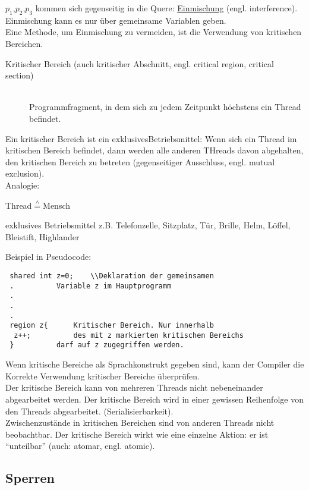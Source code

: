 \documentclass[a4paper,12pt]{scrartcl}
\begin{document}
$p_1$,$p_2$,$p_3$ kommen sich gegenseitig in die Quere: \underline{Einmischung} (engl. interference). Einmischung kann es nur über gemeinsame Variablen geben.\\
Eine Methode, um Einmischung zu vermeiden, ist die Verwendung von kritischen Bereichen.\\
\begin{description}
 \item[Kritischer Bereich (auch kritischer Abschnitt, engl. critical region, critical section)]\quad\\
     Programmfragment, in dem sich zu jedem Zeitpunkt höchstens ein Thread befindet.
\end{description}
Ein kritischer Bereich ist ein \glqq{}exklusives\grqq{}Betriebsmittel: Wenn sich ein Thread im kritischen Bereich befindet, dann werden alle anderen THreads davon abgehalten, den kritischen Bereich zu betreten (\glqq{}gegenseitiger Ausschluss\grqq{}, engl. mutual exclusion).\\
Analogie:
\begin{description}
 \item Thread$\overset{\wedge}{=}$Mensch
 \item exklusives Betriebsmittel z.B. Telefonzelle, Sitzplatz, Tür, Brille, Helm, Löffel, Bleistift, Highlander
\end{description}
Beispiel in Pseudocode:
\begin{lstlisting}
 shared int z=0; 	\\Deklaration der gemeinsamen 
 .			Variable z im Hauptprogramm
 .
 .
 .
 region z{		Kritischer Bereich. Nur innerhalb
  z++;			des mit z markierten kritischen Bereichs
 }			darf auf z zugegriffen werden.
\end{lstlisting}

Wenn kritische Bereiche als Sprachkonstrukt gegeben sind, kann der Compiler die Korrekte Verwendung kritischer Bereiche überprüfen.\\
Der kritische Bereich kann von mehreren Threads nicht nebeneinander abgearbeitet werden. Der kritische Bereich wird in einer gewissen Reihenfolge von den Threads abgearbeitet. (\glqq{}Serialisierbarkeit\grqq{}).\\
Zwischenzustände in kritischen Bereichen sind von anderen Threads nicht beobachtbar. Der kritische Bereich wirkt wie eine einzelne Aktion: er ist "`unteilbar"' (auch: atomar, engl. atomic).

\subsection{Sperren}
\end{document}
